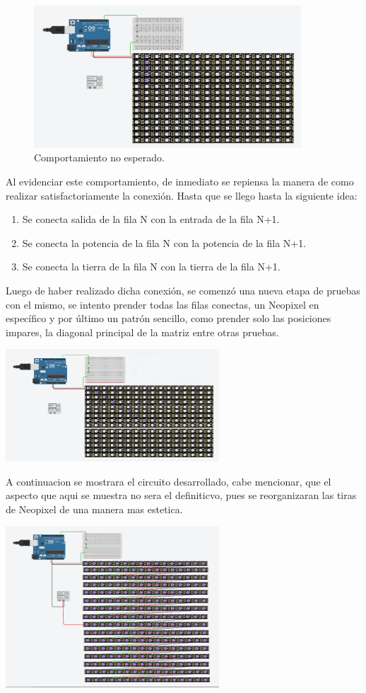 \documentclass{article}
\begin{document}
\begin{figure}[h]
  \includegraphics[width=10cm]{figura_2.png}
  \centering
  \caption{Comportamiento no esperado.}
  \label{fig:por_columnas}
\end{figure}
Al evidenciar este comportamiento, de inmediato se repiensa la manera de como realizar satisfactoriamente la conexión. Hasta que se llego hasta la siguiente idea:
\begin{enumerate}
    \item Se conecta salida de la fila N con la entrada de la fila N+1.
    \item Se conecta la potencia de la fila N con la potencia de la fila N+1.
    \item Se conecta la tierra de la fila N con la tierra de la fila N+1.
\end{enumerate}
Luego de haber realizado dicha conexión, se comenzó una nueva etapa de pruebas con el mismo, se intento prender todas las filas conectas, un Neopixel en específico y por último un patrón sencillo, como prender solo las posiciones impares, la diagonal principal de la matriz entre otras pruebas.

\includegraphics[width=8cm]{figura_3.png}
  
A continuacion se mostrara el circuito desarrollado, cabe mencionar, que el aspecto que aqui se muestra no sera el definiticvo, pues se reorganizaran las tiras de Neopixel de una manera mas estetica.

\includegraphics[width=8cm]{figura_4.png}
\end{document}
